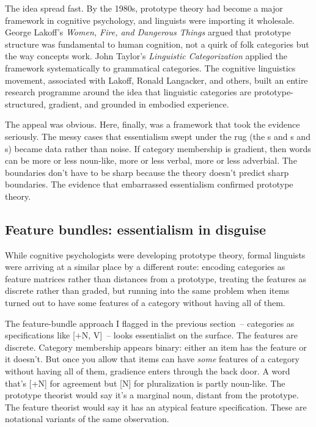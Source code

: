 The idea spread fast. By the 1980s, prototype theory had become a major framework in cognitive psychology, and linguists were importing it wholesale. George Lakoff's \textit{Women, Fire, and Dangerous Things} \citep{lakoff1987} argued that prototype structure was fundamental to human cognition, not a quirk of folk categories but the way concepts work. John Taylor's \textit{Linguistic Categorization} \citep{taylor2003} applied the framework systematically to grammatical categories. The cognitive linguistics movement, associated with Lakoff, Ronald Langacker, and others, built an entire research programme around the idea that linguistic categories are prototype-structured, gradient, and grounded in embodied experience.

The appeal was obvious. Here, finally, was a framework that took the evidence seriously. The messy cases that essentialism swept under the rug (the s and s and s) became data rather than noise. If category membership is gradient, then words can be more or less noun-like, more or less verbal, more or less adverbial. The boundaries don't have to be sharp because the theory doesn't predict sharp boundaries. The evidence that embarrassed essentialism confirmed prototype theory.

\subsection{Feature bundles: essentialism in disguise}
\label{sec:1:feature-bundles}

While cognitive psychologists were developing prototype theory, formal linguists were arriving at a similar place by a different route: encoding categories as feature matrices rather than distances from a prototype, treating the features as discrete rather than graded, but running into the same problem when items turned out to have some features of a category without having all of them.

The feature-bundle approach I flagged in the previous section~-- categories as specifications like [+N, V]~-- looks essentialist on the surface. The features are discrete. Category membership appears binary: either an item has the feature or it doesn't. But once you allow that items can have \emph{some} features of a category without having all of them, gradience enters through the back door. A word that's [+N] for agreement but [N] for pluralization is partly noun-like. The prototype theorist would say it's a marginal noun, distant from the prototype. The feature theorist would say it has an atypical feature specification. These are notational variants of the same observation.

